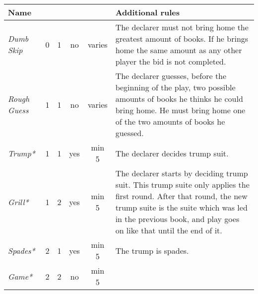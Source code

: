 %
%
%

\begin{table}
	\begin{center}
		\footnotesize {
			\begin{tabular*}{\textwidth}{ lcccc | p{5cm} }
					\textbf{Name} & \rotccw{\textbf{Worth}} & \rotccw{\textbf{Score}} & \rotccw{\textbf{Trump}} & \rotccw{\textbf{Books}} & \textbf{Additional rules}
					\\ \hline
					
					\textit{Dumb Skip} &
					0 & 1 & no & varies &
					The declarer must not bring home the greatest amount of books. If he brings home the same amount as any other player the bid is not completed.
					\\ \hline
					
					\textit{Rough Guess} &
					1 & 1 & no & varies &
					The declarer guesses, before the beginning of the play, two possible amounts of books he thinks he could bring home. He must bring home one of the two amounts of books he guessed.
					\\ \hline
					
					\textit{Trump*} &
					1 & 1 & yes & min 5 &
					The declarer decides trump suit.
					\\ \hline
					
					\textit{Grill*} &
					1 & 2 & yes & min 5 &
					The declarer starts by deciding trump suit. This trump suite only applies the first round. After that round, the new trump suite is the suite which was led in the previous book, and play goes on like that until the end of it. \\ \hline
					\textit{Spades*} &
					2 & 1 & yes & min 5 &
					The trump is spades.
					\\ \hline
					
					\textit{Game*} &
					2 & 2 & no & min 5 &
					\\ \hline
					

\end{tabular*}}
\end{center}
\end{table}
